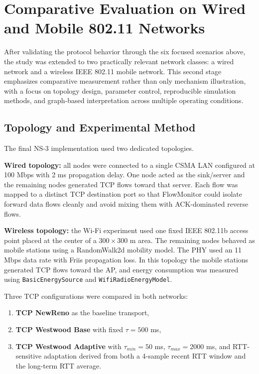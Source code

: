 \documentclass[conference,10pt,a4paper]{IEEEtran}
\begin{document}
\section{Comparative Evaluation on Wired and Mobile 802.11 Networks}

After validating the protocol behavior through the six focused scenarios above, the study was extended to two practically relevant network classes: a wired network and a wireless IEEE 802.11 mobile network. This second stage emphasizes comparative measurement rather than only mechanism illustration, with a focus on topology design, parameter control, reproducible simulation methods, and graph-based interpretation across multiple operating conditions.

\subsection{Topology and Experimental Method}

The final NS-3 implementation used two dedicated topologies.

\textbf{Wired topology:} all nodes were connected to a single CSMA LAN configured at 100 Mbps with 2 ms propagation delay. One node acted as the sink/server and the remaining nodes generated TCP flows toward that server. Each flow was mapped to a distinct TCP destination port so that FlowMonitor could isolate forward data flows cleanly and avoid mixing them with ACK-dominated reverse flows.

\textbf{Wireless topology:} the Wi-Fi experiment used one fixed IEEE 802.11b access point placed at the center of a $300 \times 300$ m area. The remaining nodes behaved as mobile stations using a RandomWalk2d mobility model. The PHY used an 11 Mbps data rate with Friis propagation loss. In this topology the mobile stations generated TCP flows toward the AP, and energy consumption was measured using \texttt{BasicEnergySource} and \texttt{WifiRadioEnergyModel}.

Three TCP configurations were compared in both networks:
\begin{enumerate}
    \item \textbf{TCP NewReno} as the baseline transport,
    \item \textbf{TCP Westwood Base} with fixed $\tau = 500$ ms,
    \item \textbf{TCP Westwood Adaptive} with $\tau_{min}=50$ ms, $\tau_{max}=2000$ ms, and RTT-sensitive adaptation derived from both a 4-sample recent RTT window and the long-term RTT average.
\end{enumerate}
\end{document}
